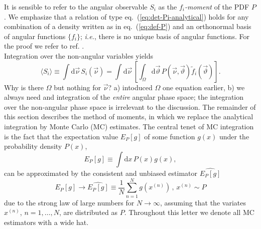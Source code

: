 \documentclass[aps,prd,reprint,nofootinbib,preprintnumbers]{revtex4}
\newcommand{\dual}[1]{\tilde{#1}}
\newcommand{\est}[1]{\widehat{#1}}
\newcommand{\ie}{\textit{i.e.}}
\newcommand{\nuvec}{\vec{\nu}}
\newcommand{\refeq}[1]{eq.~(\ref{eq:#1})}
\newcommand{\rmdx}[1]{\mbox{d} #1 \,} %
\newcommand{\thvec}{\vec{\vartheta}}
\renewcommand{\theta}{\vartheta}
\newcommand{\danny}[1]{{\color{purple}#1}}
\newcommand{\fred}[1]{{\color{brown!85!black}#1}}
\begin{document}
It is sensible to refer to the angular observable $S_i$ as the
\emph{$f_i$-moment} of the PDF $P$.  We emphasize that a relation of
type \refeq{det-Pi-analytical} holds for any combination of a density
written as in \refeq{def-P} and an orthonormal basis of angular
functions $\lbrace f_i \rbrace$; \ie, there is no unique
basis of angular functions. For the proof we refer to ref. \cite{Dighe:1998vk}.\\

Integration over the non-angular variables yields
\begin{equation}
    \langle S_i\rangle
    \equiv \int \rmdx{\vec\nu} S_i(\nuvec)
    = \int \rmdx{\vec \nu} \left[\int_{\Omega} \rmdx{\vec \theta} P(\nuvec,\thvec) \dual{f}_i(\thvec) \right].
\end{equation}
\fred{Why is there $\Omega$ but nothing for $\nuvec$?}
\danny{a) intoduced $\Omega$ one equation earlier, b) we always need
and integration of the \emph{entire} angular phase space; the integration
over the non-angular phase space is irrelevant to the discussion.}
The remainder of this section describes the method of moments, in
which we replace the analytical integration by Monte Carlo (MC)
estimates.  The central tenet of MC integration is the fact that the
expectation value $E_P[g]$ of some function $g(x)$ under the
probability density $P(x)$,
\begin{equation}
    E_P[g] \equiv \int \rmdx{x} P(x) g(x),
\end{equation}
can be approximated by the consistent and unbiased
estimator $\est{E_P[g]}$~\cite[sec. 8.2]{James:2006zz}
\begin{equation}
    \label{eq:mc-id}
    E_P[g] \to \widehat{E_P[g]} \equiv \frac{1}{N} \sum_{n=1}^N g(x^{(n)}) \,,\,    x^{(n)} \sim P
\end{equation}
due to the strong law of large numbers for $N \to \infty$, assuming
that the variates $x^{(n)}$, $n = 1, \dots, N$, are distributed as
$P$.
Throughout this letter we denote all MC estimators with a wide hat.\\
\end{document}

